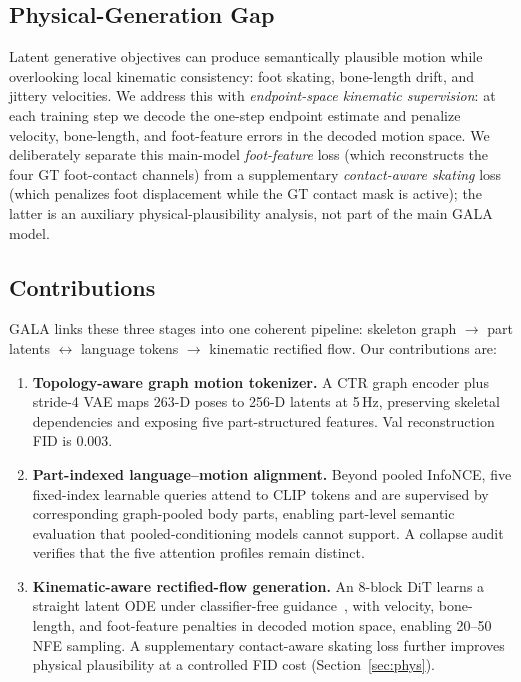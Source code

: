 \documentclass[journal]{IEEEtran}
\begin{document}
\subsection{Physical-Generation Gap}
\label{sec:intro-phys}

Latent generative objectives can produce semantically plausible motion while overlooking local kinematic consistency: foot skating, bone-length drift, and jittery velocities. We address this with \emph{endpoint-space kinematic supervision}: at each training step we decode the one-step endpoint estimate and penalize velocity, bone-length, and foot-feature errors in the decoded motion space. We deliberately separate this main-model \emph{foot-feature} loss (which reconstructs the four GT foot-contact channels) from a supplementary \emph{contact-aware skating} loss (which penalizes foot displacement while the GT contact mask is active); the latter is an auxiliary physical-plausibility analysis, not part of the main GALA model.

\subsection{Contributions}

GALA links these three stages into one coherent pipeline: skeleton graph $\to$ part latents $\leftrightarrow$ language tokens $\to$ kinematic rectified flow. Our contributions are:
\begin{enumerate}\itemsep2pt
\item \textbf{Topology-aware graph motion tokenizer.} A CTR graph encoder plus stride-4 VAE maps 263-D poses to 256-D latents at 5\,Hz, preserving skeletal dependencies and exposing five part-structured features. Val reconstruction FID is $0.003$.
\item \textbf{Part-indexed language--motion alignment.} Beyond pooled InfoNCE, five fixed-index learnable queries attend to CLIP tokens and are supervised by corresponding graph-pooled body parts, enabling part-level semantic evaluation that pooled-conditioning models cannot support. A collapse audit verifies that the five attention profiles remain distinct.
\item \textbf{Kinematic-aware rectified-flow generation.} An 8-block DiT learns a straight latent ODE under classifier-free guidance~\cite{ho2022cfg}, with velocity, bone-length, and foot-feature penalties in decoded motion space, enabling 20--50 NFE sampling. A supplementary contact-aware skating loss further improves physical plausibility at a controlled FID cost (Section~\ref{sec:phys}).
\end{enumerate}
\end{document}
